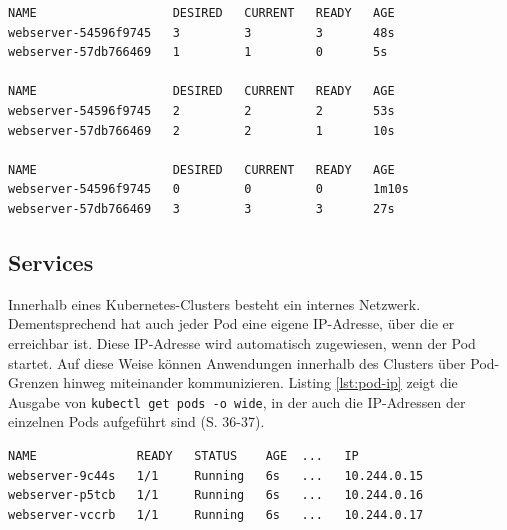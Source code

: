 \documentclass[11pt,a4paper]{article}
\begin{document}
\begin{lstlisting}[caption={Ein Deployment, das schrittweise ein Update ausführt \cite{Schmeling_Dargatz_2022} (S. 31).}, label={lst:deploy-rollout}]
NAME                   DESIRED   CURRENT   READY   AGE
webserver-54596f9745   3         3         3       48s
webserver-57db766469   1         1         0       5s

NAME                   DESIRED   CURRENT   READY   AGE
webserver-54596f9745   2         2         2       53s
webserver-57db766469   2         2         1       10s

NAME                   DESIRED   CURRENT   READY   AGE
webserver-54596f9745   0         0         0       1m10s
webserver-57db766469   3         3         3       27s
\end{lstlisting}

\subsection{Services}
Innerhalb eines Kubernetes-Clusters besteht ein internes Netzwerk. Dementsprechend hat auch jeder Pod
eine eigene IP-Adresse, über die er erreichbar ist. Diese IP-Adresse wird automatisch zugewiesen, wenn der Pod startet.
Auf diese Weise können Anwendungen innerhalb des Clusters über Pod-Grenzen hinweg miteinander kommunizieren.
Listing \ref{lst:pod-ip} zeigt die Ausgabe von \lstinline|kubectl get pods -o wide|, in der auch die IP-Adressen
der einzelnen Pods aufgeführt sind \cite{Schmeling_Dargatz_2022} (S. 36-37).
\begin{lstlisting}[caption={\lstinline|kubectl get pods -o wide| veranschautlicht, dass jeder Pod seine eigene IP-Adresse erhält. Die Ausgabe wurde zur besseren Lesbarkeit gekürzt \cite{Schmeling_Dargatz_2022} (S. 35).}, label={lst:pod-ip}]
NAME              READY   STATUS    AGE  ...   IP           
webserver-9c44s   1/1     Running   6s   ...   10.244.0.15
webserver-p5tcb   1/1     Running   6s   ...   10.244.0.16
webserver-vccrb   1/1     Running   6s   ...   10.244.0.17
\end{lstlisting}
\end{document}
